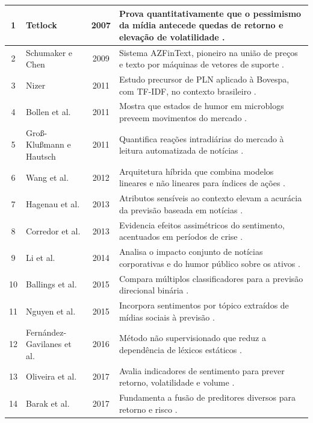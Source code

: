 {\begin{longtable}{c p{3.6cm} c p{7.4cm}}
1 & Tetlock & 2007 & Prova quantitativamente que o pessimismo da mídia antecede quedas de retorno e elevação de volatilidade \cite{tetlock_giving_2007}. \\ \hline
2 & Schumaker e Chen & 2009 & Sistema AZFinText, pioneiro na união de preços e texto por máquinas de vetores de suporte \cite{schumaker_quantitative_2009}. \\ \hline
3 & Nizer & 2011 & Estudo precursor de PLN aplicado à Bovespa, com TF-IDF, no contexto brasileiro \cite{nizer_metodo_2011}. \\ \hline
4 & Bollen et al. & 2011 & Mostra que estados de humor em microblogs preveem movimentos do mercado \cite{bollen_twitter_2011}. \\ \hline
5 & Groß-Klußmann e Hautsch & 2011 & Quantifica reações intradiárias do mercado à leitura automatizada de notícias \cite{gros-klusmann_when_2011}. \\ \hline
6 & Wang et al. & 2012 & Arquitetura híbrida que combina modelos lineares e não lineares para índices de ações \cite{wang_stock_2012}. \\ \hline
7 & Hagenau et al. & 2013 & Atributos sensíveis ao contexto elevam a acurácia da previsão baseada em notícias \cite{hagenau_automated_2013}. \\ \hline
8 & Corredor et al. & 2013 & Evidencia efeitos assimétricos do sentimento, acentuados em períodos de crise \cite{corredor_investor_2013}. \\ \hline
9 & Li et al. & 2014 & Analisa o impacto conjunto de notícias corporativas e do humor público sobre os ativos \cite{li_effect_2014}. \\ \hline
10 & Ballings et al. & 2015 & Compara múltiplos classificadores para a previsão direcional binária \cite{ballings_evaluating_2015}. \\ \hline
11 & Nguyen et al. & 2015 & Incorpora sentimentos por tópico extraídos de mídias sociais à previsão \cite{nguyen_sentiment_2015}. \\ \hline
12 & Fernández-Gavilanes et al. & 2016 & Método não supervisionado que reduz a dependência de léxicos estáticos \cite{fernandez-gavilanes_unsupervised_2016}. \\ \hline
13 & Oliveira et al. & 2017 & Avalia indicadores de sentimento para prever retorno, volatilidade e volume \cite{oliveira_impact_2017}. \\ \hline
14 & Barak et al. & 2017 & Fundamenta a fusão de preditores diversos para retorno e risco \cite{barak_fusion_2017}. \\ \hline

\end{longtable}}
